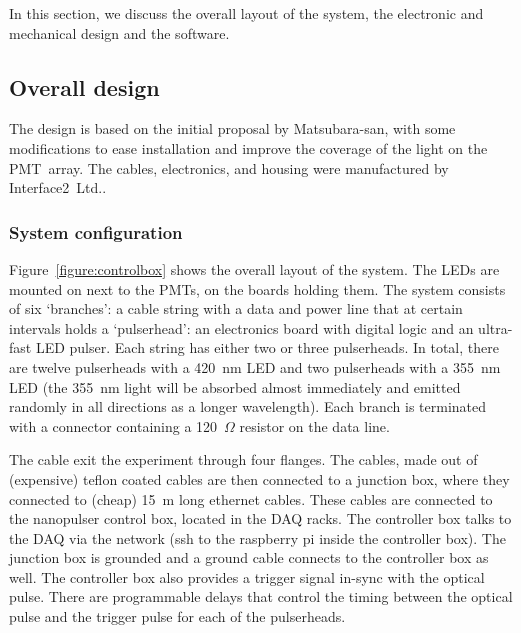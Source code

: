 

In this section, we discuss the overall layout of the system, the electronic and mechanical design and the software.


\subsection*{Overall design}

The design is based on the initial proposal by Matsubara-san, with some modifications to ease installation and improve the coverage of the light on the PMT~array. The cables, electronics, and housing were manufactured by Interface2~Ltd.\cite{INTERFACE2}.

\subsubsection*{System configuration}
%
%

Figure~\ref{figure:controlbox} shows the overall layout of the system. The LEDs are mounted on next to the PMTs, on the boards holding them. The system consists of six `branches': a cable string with a data and power line that at certain intervals holds a `pulserhead': an electronics board with digital logic and an ultra-fast LED pulser. Each string has either two or three pulserheads. In total, there are twelve pulserheads with a 420~nm LED and two pulserheads with a 355~nm LED (the 355~nm light will be absorbed almost immediately and emitted randomly in all directions as a longer wavelength). Each branch is terminated with a connector containing a 120~$\Omega$ resistor on the data line. 

The cable exit the experiment through four flanges. The cables, made out of (expensive) teflon coated cables are then connected to a junction box, where they connected to (cheap) 15~m long ethernet cables. These cables are connected to the nanopulser control box, located in the DAQ racks. The controller box talks to the DAQ via the network (ssh to the raspberry pi inside the controller box). The junction box is grounded and a ground cable connects to the controller box as well. The controller box also provides a trigger signal in-sync with the optical pulse. There are programmable delays that control the timing between the optical pulse and the trigger pulse for each of the pulserheads. 

